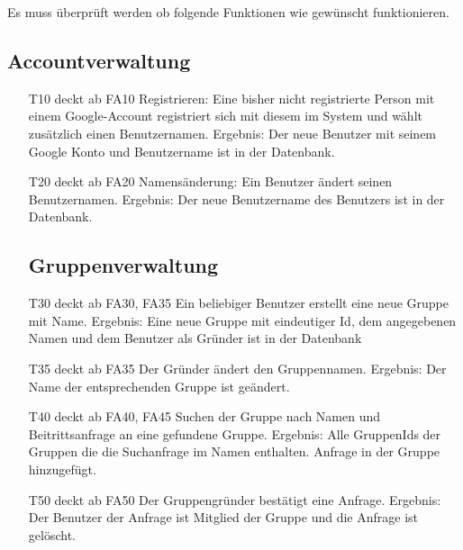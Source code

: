 \documentclass{scrartcl}
\begin{document}
	Es muss überprüft werden ob folgende Funktionen wie gewünscht funktionieren.
	
	\subsection{Accountverwaltung}
	\begin{itemize} 
		\item[T10] deckt ab FA10 \newline
		Registrieren: Eine bisher nicht registrierte Person mit einem Google-Account registriert sich mit diesem im System 				und wählt zusätzlich einen Benutzernamen. \newline
		Ergebnis: Der neue Benutzer mit seinem Google Konto und Benutzername ist in der Datenbank.

		\item[T20] deckt ab FA20\newline
		 Namensänderung: Ein Benutzer ändert seinen Benutzernamen. \newline
		Ergebnis: Der neue Benutzername des Benutzers ist in der Datenbank. 
	
	\subsection{Gruppenverwaltung}
	
		\item[T30] deckt ab FA30, FA35\newline
		 Ein beliebiger Benutzer erstellt eine neue Gruppe mit Name. \newline
		Ergebnis: Eine neue Gruppe mit eindeutiger Id, dem angegebenen Namen und dem Benutzer als Gründer ist in der 			Datenbank

		\item[T35] deckt ab FA35 \newline
		Der Gründer ändert den Gruppennamen.\newline
		Ergebnis: Der Name der entsprechenden Gruppe ist geändert.

		\item[T40] deckt ab FA40, FA45  \newline
		Suchen der Gruppe nach Namen und Beitrittsanfrage an eine gefundene Gruppe. \newline
		Ergebnis: Alle GruppenIds der Gruppen die die Suchanfrage im Namen enthalten. Anfrage in der Gruppe 		
		hinzugefügt.

		\item[T50] deckt ab FA50  \newline
		Der Gruppengründer bestätigt eine Anfrage. \newline
		Ergebnis: Der Benutzer der Anfrage ist \gls{Mitglied} der Gruppe und die Anfrage ist gelöscht.


\end{itemize}
\end{document}
